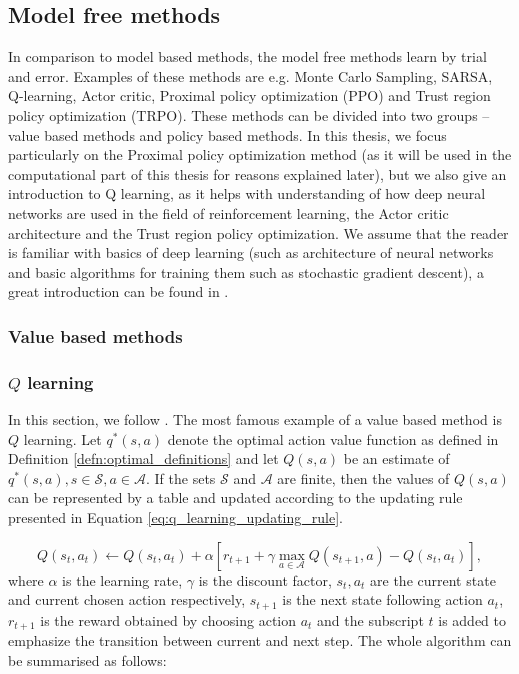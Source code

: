 \subsection{Model free methods}
In comparison to model based methods, the model free methods learn by trial and error.
Examples of these methods are e.g. Monte Carlo Sampling, SARSA, Q-learning, Actor critic, Proximal policy optimization (PPO) and Trust region policy optimization (TRPO). These methods can be divided into two groups -- value based methods and policy based methods. In this thesis, we focus particularly on the Proximal policy optimization method (as it will be used in the computational part of this thesis for reasons explained later), but we also give an introduction to Q learning, as it helps with understanding of how deep neural networks are used in the field of reinforcement learning, the Actor critic architecture and the Trust region policy optimization. We assume that the reader is familiar with basics of deep learning (such as architecture of neural networks and basic algorithms for training them such as stochastic gradient descent), a great introduction can be found in \cite[Part 2]{deep_learning_book}.
\subsubsection{Value based methods}
\subsubsection{$Q$ learning}
In this section, we follow \cite[Section 6.5.]{sutton2018reinforcement}.
The most famous example of a value based method is $Q$ learning.
Let $q^*(s,a)$ denote the optimal action value function as defined in Definition \ref{defn:optimal_definitions} and let $Q(s,a)$ be an estimate of $q^*(s,a), s \in \mathcal{S}, a \in \mathcal{A}$. If the sets $\mathcal{S}$ and $\mathcal{A}$ are finite, then the values of $Q(s,a)$ can be represented by a table and updated according to the updating rule presented in Equation \ref{eq:q_learning_updating_rule}.

\begin{equation}
Q(s_t, a_t) \leftarrow Q(s_t, a_t) + \alpha \left[r_{t+1} + \gamma \underset{a \in \mathcal{A}}{\max}Q(s_{t+1}, a) - Q(s_t, a_t) \right],
\label{eq:q_learning_updating_rule}
\end{equation}
where $\alpha$ is the learning rate, $\gamma$ is the discount factor, $s_t, a_t$ are the current state and current chosen action respectively, $s_{t+1}$ is the next state following action $a_t$, $r_{t+1}$ is the reward obtained by choosing action $a_t$ and the subscript $t$ is added to emphasize the transition between current and next step.
The whole algorithm can be summarised as follows:

